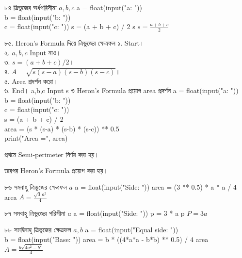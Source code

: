 
\formulaexercise
{৮৪}
{ত্রিভুজের অর্ধপরিসীমা}
{\(a,b,c\)}
{a = float(input("a: "))\\
b = float(input("b: "))\\
c = float(input("c: "))}
{s = (a + b + c) / 2}
{s}
{\(s=\frac{a+b+c}{2}\)}


\exerciseTable
{৮৫. Heron's Formula দিয়ে ত্রিভুজের ক্ষেত্রফল}
{
১. Start।\\
২. \(a,b,c\) Input নাও।\\
৩. \(s=(a+b+c)/2\)।\\
৪. \(A=\sqrt{s(s-a)(s-b)(s-c)}\)।\\
৫. Area প্রদর্শন করো।\\
৬. End।
}
{
\linearflow
{a,b,c Input}
{s ও Heron's Formula প্রয়োগ}
{area প্রদর্শন}
}
{
a = float(input("a: "))\\
b = float(input("b: "))\\
c = float(input("c: "))\\
s = (a + b + c) / 2\\
area = (s * (s-a) * (s-b) * (s-c)) ** 0.5\\
print("Area =", area)
}
{
প্রথমে Semi-perimeter নির্ণয় করা হয়।

\medskip

তারপর Heron's Formula প্রয়োগ করা হয়।
}


\formulaexercise
{৮৬}
{সমবাহু ত্রিভুজের ক্ষেত্রফল}
{\(a\)}
{a = float(input("Side: "))}
{area = (3 ** 0.5) * a * a / 4}
{area}
{\(A=\frac{\sqrt3\,a^2}{4}\)}


\formulaexercise
{৮৭}
{সমবাহু ত্রিভুজের পরিসীমা}
{\(a\)}
{a = float(input("Side: "))}
{p = 3 * a}
{p}
{\(P=3a\)}


\formulaexercise
{৮৮}
{সমদ্বিবাহু ত্রিভুজের ক্ষেত্রফল}
{\(a,b\)}
{a = float(input("Equal side: "))\\
b = float(input("Base: "))}
{area = b * ((4*a*a - b*b) ** 0.5) / 4}
{area}
{\(A=\frac{b\sqrt{4a^2-b^2}}{4}\)}


